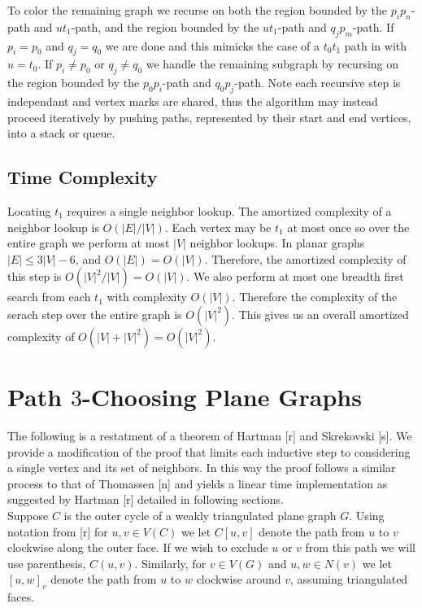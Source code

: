 \documentclass[11pt,letter]{article}
\begin{document}
\noindent To color the remaining graph we recurse on both the region
bounded by the $p_ip_n$-path and $ut_1$-path, and the region bounded by the $ut_1$-path and $q_jp_m$-path.
If $p_i=p_0$ and $q_j=q_0$ we are done and this mimicks the case of a $t_0t_1$ path in with $u=t_0$.
If $p_i\ne p_0$ or $q_j\ne q_0$ we handle the remaining subgraph by recursing on the region bounded by the
$p_0p_i$-path and $q_0p_j$-path. Note each recursive step is independant and vertex marks are shared,
thus the algorithm may instead proceed iteratively by pushing paths, represented by their start and end
vertices, into a stack or queue.

\subsection*{Time Complexity}

\noindent Locating $t_1$ requires a single neighbor lookup. The amortized complexity of a neighbor lookup is
$O(|E|/|V|)$. Each vertex may be $t_1$ at most once so over the entire graph we perform at most $|V|$ neighbor
lookups. In planar graphs $|E|\le 3|V|-6$, and $O(|E|)=O(|V|)$. Therefore, the
amortized complexity of this step is $O(|V|^2/|V|)=O(|V|)$. We also perform at most one breadth first
search from each $t_1$ with complexity $O(|V|)$. Therefore the complexity of the serach step over the
entire graph is $O(|V|^2)$. This gives us an overall amortized complexity of $O(|V|+|V|^2)=O(|V|^2)$.

\section{Path $3$-Choosing Plane Graphs}

The following is a restatment of a theorem of Hartman [r] and Skrekovski [s]. We provide a modification of
the proof that limits each inductive step to considering a single vertex and its set of neighbors. In this way
the proof follows a similar process to that of Thomassen [n] and yields a linear time implementation as suggested
by Hartman [r] detailed in following sections.\\

\noindent Suppose $C$ is
the outer cycle of a weakly triangulated plane graph $G$. Using notation from [r] for $u,v\in V(C)$ we
let $C[u,v]$ denote the path from $u$ to $v$ clockwise along the outer face. If we wish to exclude $u$ or $v$
from this path we will use parenthesis, $C(u,v)$. Similarly, for $v\in V(G)$ and
$u,w\in N(v)$ we let $[u,w]_v$ denote the path from $u$ to $w$ clockwise around $v$, assuming triangulated
faces.\\
\end{document}
